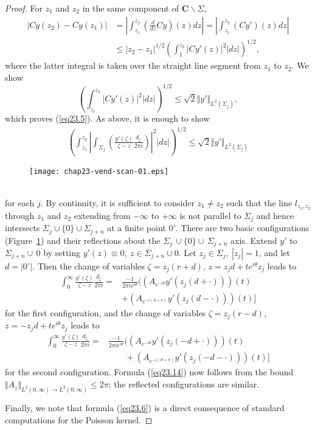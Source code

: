 \documentclass{surv-l}
\theoremstyle{plain}
\theoremstyle{definition}
\numberwithin{equation}{chapter}
\begin{document}
\begin{proof}
For $z_{1}$ and $z_{2}$ in the same component of $\textbf{C}\backslash \Sigma$,
\begin{align*}
|Cy(z_{2})-Cy(z_{1})| & = \left|\int_{z_{1}}^{z_{2}}\left(\frac{d}{dz}Cy\right) (z)dz\right|=\left|\int_{z_{1}}^{z_{2}}(Cy')(z)dz\right| \\
& \leq |z_{2}-z_{1}|^{1/2}\left(\int_{1}^{z_{2}}|Cy'(z)|^{2}|dz|\right)^{1/2},
\end{align*}
where the latter integral is taken over the straight line segment from $z_{1}$ to $z_{2}$. We show
\begin{equation*}
\left(\int_{z_{1}}^{z_{2}}|Cy'(z)|^{2}|dz|\right)^{1/2}\leq \sqrt{2}\Vert y' \Vert_{L^{2}(\Sigma_{j})},
\end{equation*}
which proves (\ref{eq23.5}). As above, it is enough to show
\renewcommand\theequation{23.14}
\setcounter{equation}{13}
\begin{align}\label{eq23.14}
\left(\int_{z_{1}}^{z_{2}}\left|\int_{\Sigma_{j}}\left(\frac{y'(\zeta)}{\zeta-z}\frac{d_{\zeta}}{2\pi i}\right)\right|^{2}|dz|\right)^{1/2}\leq \sqrt{2}\Vert y' \Vert_{L^{2}(\Sigma_{j})}
\end{align}
\begin{figure}
\texttt{[image: chap23-vend-scan-01.eps]}
\caption{}\label{fig9}
\end{figure}\\
for each $j$. By continuity, it is sufficient to consider $z_{1}\neq z_{2}$ such that the line $l_{z_{1},z_{2}}$ through $z_{1}$ and $z_{2}$ extending from $-\infty$ to $+\infty$ is not parallel to $\Sigma_{j}$ and hence intersects $\Sigma_{j}\cup\{0\}\cup\Sigma_{j+n}$ at a finite point $0'$. There are two basic configurations (Figure~\ref{fig9}) and their reflections about the $\Sigma_{j}\,\cup\{0\}\cup\,\Sigma_{j+n}$ axis. Extend $y'$ to $\Sigma_{j+n}\cup\, 0$ by setting $y'(z)\equiv 0,\ z\in\Sigma_{j+n}\cup 0$. Let $z_{j}\in\Sigma_{j},\ |z_{j}|=1$, and let $d=|0'|$. Then the change of variables $\zeta=z_{j}(r+d)$, $ z=z_{j}d+te^{i\theta}z_{j}$ leads to
\begin{align*}
\int_{0}^{\infty}\frac{y'(\zeta)}{\zeta-z}\frac{d_{\zeta}}{2\pi i}= & \frac{-1}{2\pi ie^{i\theta}}((A_{e^{-i\theta}}y'(z_{j}(d+\cdot)))(t)\\
& +(A_{e^{-i(\theta+\pi)}}y'(z_{j}(d-\cdot)))(t)]
\end{align*}
for the first configuration, and the change of variables $\zeta=z_{j}(r-d)$, $z=-z_{j}d+ te^{i\theta}z_{j}$ leads to
\begin{align*}
\int_{0}^{\infty}\frac{y'(\zeta)}{\zeta-z}\frac{d_{\zeta}}{2\pi i}= & \frac{-1}{2\pi ie^{i\theta}}((A_{e^{-i\theta}}y'(z_{j}(-d+\cdot)))(t)\\
&\qquad +(A_{e^{-i(\theta+\pi)}}y'(z_{j}(-d-\cdot)))(t)]
\end{align*}
for the second configuration. Formula (\ref{eq23.14}) now follows from the bound $\Vert A_{z}\Vert_{{L^{2}}(0,\infty)\rightarrow L^{2}(0,\infty)}\leq 2\pi$; the reflected configurations are similar.

Finally, we note that formula (\ref{eq23.6}) is a direct consequence of standard computations for the Poisson kernel.
\end{proof}
\end{document}
